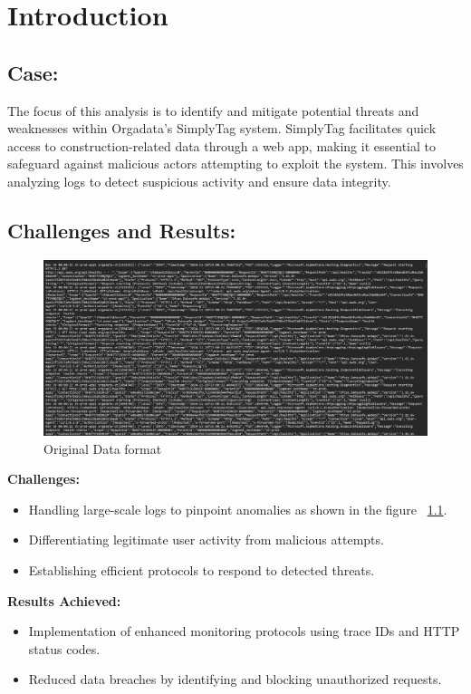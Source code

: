 %
%

\chapter{Introduction}

\section{Case:}

The focus of this analysis is to identify and mitigate potential threats and weaknesses within Orgadata’s SimplyTag system. SimplyTag facilitates quick access to construction-related data through a web app, making it essential to safeguard against malicious actors attempting to exploit the system. This involves analyzing logs to detect suspicious activity and ensure data integrity.

\section{Challenges and Results:}

\begin{figure}
	\begin{center}
		\includegraphics[width=0.7\linewidth]{Images/Data_Img.png}
		\caption{Original Data format}
		\label{Data_Img} 
	\end{center}
\end{figure}

\textbf{Challenges:}
\begin{itemize}
	\item Handling large-scale logs to pinpoint anomalies as shown in the figure ~\ref{Data_Img}.
	\item Differentiating legitimate user activity from malicious attempts.
	\item Establishing efficient protocols to respond to detected threats.
\end{itemize}

\textbf{Results Achieved:}
\begin{itemize}
	\item Implementation of enhanced monitoring protocols using trace IDs and HTTP status codes.
	\item Reduced data breaches by identifying and blocking unauthorized requests.
\end{itemize}



